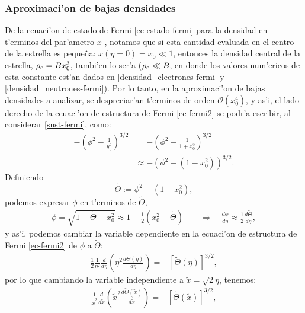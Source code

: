 \subsubsection{Aproximaci'on de bajas densidades}
De la ecuaci'on de estado de Fermi \eqref{ec-estado-fermi} para la densidad en t'erminos del par'ametro $x$ , notamos que si esta cantidad evaluada en el centro de la estrella es peque\~na: $x(\eta=0)=x_0\ll1$, entonces la densidad central de la estrella, $\rho_{\rm c}=Bx_0^3$, tambi'en lo ser'a ($\rho_{\rm c}\ll B$, en donde los valores num'ericos de esta constante est'an dados en \eqref{densidad_electrones-fermi} y \eqref{densidad_neutrones-fermi}). Por lo tanto, en la aproximaci'on de bajas densidades a analizar, se despreciar'an t'erminos de orden $\mathcal{O}(x_0^4)$, y as'i, el lado derecho de la ecuaci'on de estructura de Fermi \eqref{ec-fermi2} se podr'a escribir, al considerar \eqref{sust-fermi}, como:
\begin{align}
 -\left(\phi^2-\frac{1}{y_0^2}\right)^{3/2}&=-\left(\phi^2-\frac{1}{1+x_0^2}\right)^{3/2}\\
&\approx-\left(\phi^2-(1-x_0^2)\right)^{3/2}.
\end{align}
Definiendo
\begin{equation}\label{ec-fermi-sust-5/3-1}
 \widetilde{\Theta}:=\phi^2-(1-x_0^2),
\end{equation}
podemos expresar $\phi$ en t'erminos de $\widetilde{\Theta}$,
\begin{align}
\phi=\sqrt{1+\widetilde{\Theta}-x_0^2}\approx1-\frac{1}{2}\left(x_0^2-\widetilde{\Theta}\right)\qquad\Rightarrow\quad \frac{d\phi}{d\eta}\approx\frac{1}{2}\frac{d\widetilde{\Theta}}{d\eta},\label{ec-fermi-sust-5/3}
\end{align}
y as'i, podemos cambiar la variable dependiente en la ecuaci'on de estructura de Fermi \eqref{ec-fermi2} de $\phi$ a $\widetilde{\Theta}$:
\begin{align}\label{ec-fermi-ec5/3-1}
 \frac{1}{2}\frac{1}{\eta^2}\frac{d}{d\eta}\left(\eta^2\frac{d\widetilde{\Theta}(\eta)}{d\eta}\right)=-\left[\widetilde{\Theta}(\eta)\right]^{3/2},
\end{align}
por lo que cambiando la variable independiente a $\widetilde{x}=\sqrt{2}\eta$, tenemos:
\begin{align}\label{ec-fermi-ec5/3-2}
 \frac{1}{\widetilde{x}^2}\frac{d}{d\widetilde{x}}\left(\widetilde{x}^2\frac{d\widetilde{\Theta}(\widetilde{x})}{d\widetilde{x}}\right)=-\left[\widetilde{\Theta}(\widetilde{x})\right]^{3/2},
\end{align}
